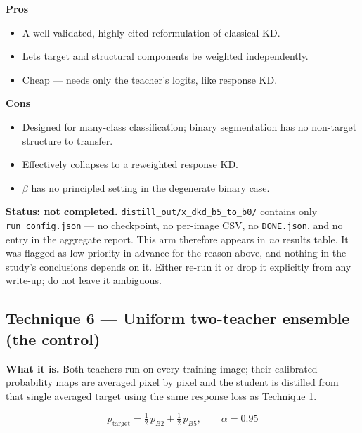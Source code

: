 \documentclass[11pt]{article}
\newcommand{\pro}[1]{\item[\textcolor{proscol}{$+$}] #1}
\newcommand{\con}[1]{\item[\textcolor{conscol}{$-$}] #1}
\begin{document}
\begin{minipage}[t]{0.475\textwidth}
\textbf{\textcolor{proscol}{Pros}}
\begin{itemize}[leftmargin=1.5em,itemsep=1pt,label={},labelwidth=1em,labelsep=0.4em,align=left]
  \pro{A well-validated, highly cited reformulation of classical KD.}
  \pro{Lets target and structural components be weighted independently.}
  \pro{Cheap --- needs only the teacher's logits, like response KD.}
\end{itemize}
\end{minipage}\hfill%
\begin{minipage}[t]{0.475\textwidth}
\textbf{\textcolor{conscol}{Cons}}
\begin{itemize}[leftmargin=1.5em,itemsep=1pt,label={},labelwidth=1em,labelsep=0.4em,align=left]
  \con{Designed for many-class classification; binary segmentation has no non-target structure to
       transfer.}
  \con{Effectively collapses to a reweighted response KD.}
  \con{$\beta$ has no principled setting in the degenerate binary case.}
\end{itemize}
\end{minipage}

\begin{warnbox}
\textbf{Status: not completed.} \texttt{distill\_out/x\_dkd\_b5\_to\_b0/} contains only
\texttt{run\_config.json} --- no checkpoint, no per-image CSV, no \texttt{DONE.json}, and no entry
in the aggregate report. This arm therefore appears in \emph{no} results table. It was flagged as
low priority in advance for the reason above, and nothing in the study's conclusions depends on it.
Either re-run it or drop it explicitly from any write-up; do not leave it ambiguous.
\end{warnbox}

\subsection{Technique 6 --- Uniform two-teacher ensemble (the control)}

\textbf{What it is.} Both teachers run on every training image; their calibrated probability maps
are averaged pixel by pixel and the student is distilled from that single averaged target using the
same response loss as Technique 1.

\[
  p_{\text{target}} = \tfrac{1}{2}\,p_{B2} + \tfrac{1}{2}\,p_{B5},
  \qquad \alpha = 0.95
\]
\end{document}
